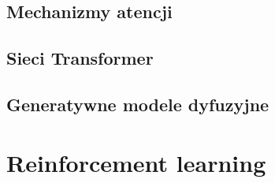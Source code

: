 \documentclass{myclass}
\begin{document}
\subsection{Mechanizmy atencji}

\subsection{Sieci Transformer}

\subsection{Generatywne modele dyfuzyjne}


\section{Reinforcement learning}
\end{document}
